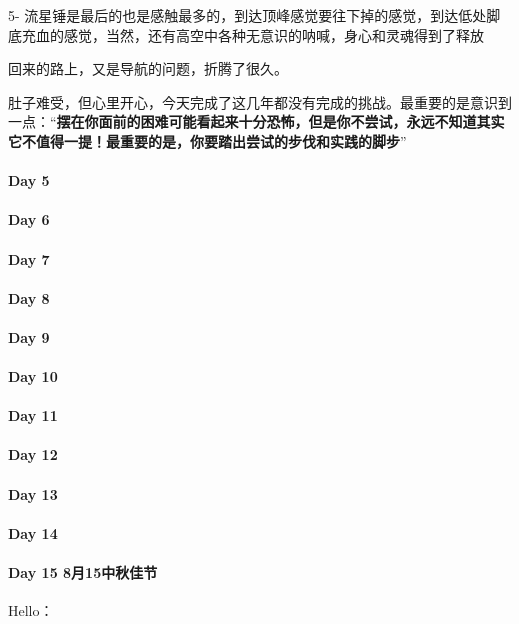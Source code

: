 \documentclass[UTF8,a4paper,8pt]{ctexbook}
\begin{document}
	 	 5- 流星锤是最后的也是感触最多的，到达顶峰感觉要往下掉的感觉，到达低处脚底充血的感觉，当然，还有高空中各种无意识的呐喊，身心和灵魂得到了释放
	 	 
	 	 回来的路上，又是导航的问题，折腾了很久。
	 	 
	 	 肚子难受，但心里开心，今天完成了这几年都没有完成的挑战。最重要的是意识到一点：“\textbf{摆在你面前的困难可能看起来十分恐怖，但是你不尝试，永远不知道其实它不值得一提！最重要的是，你要踏出尝试的步伐和实践的脚步}”
 	 \paragraph{Day 5       \quad     }
 	 \paragraph{Day 6       \quad     }
 	 \paragraph{Day 7       \quad     }
 	 \paragraph{Day 8       \quad     }
 	 \paragraph{Day 9       \quad     }
 	 \paragraph{Day 10      \quad     }
 	 \paragraph{Day 11      \quad     }
 	 \paragraph{Day 12      \quad     }
 	 \paragraph{Day 13      \quad     }
 	 \paragraph{Day 14      \quad     }
 	 \paragraph{Day 15  8月15中秋佳节    \quad     }
	 	 Hello：
	 	 
\end{document}
